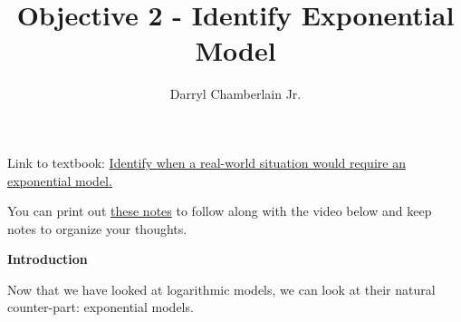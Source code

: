 \documentclass{ximera}
\author{Darryl Chamberlain Jr.}
\title{Objective 2 - Identify Exponential Model}
\begin{document}
\begin{abstract}

\end{abstract}

\maketitle
 
Link to textbook: 
\href{https://cnx.org/contents/mwjClAV_@8.21:_tqWoaDz@17/Exponential-and-Logarithmic-Models}{Identify when a real-world situation would require an exponential model.}

You can print out \href{http://people.clas.ufl.edu/dchamberlain31/files/M11M-Objective-2-Identify-Exp-Model.pdf}{these notes} to follow along with the video below and keep notes to organize your thoughts.

 

\begin{center} \textbf{\Large Introduction} \end{center}

Now that we have looked at logarithmic models, we can look at their natural counter-part: exponential models. 
\end{document}
